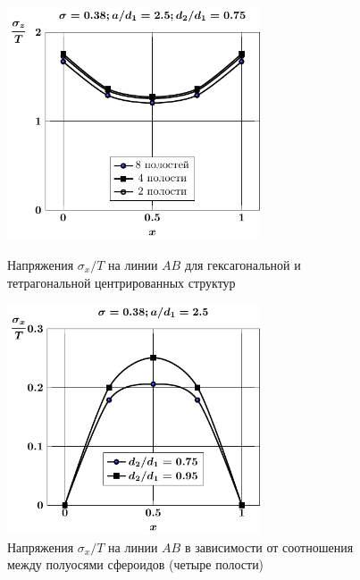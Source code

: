 %

\begin{figure}[h!]
\centering\footnotesize
\parbox[b]{7.5cm}{\centering\includegraphics[width=7.5cm]{cav8-4-2-sig_z-spheroids.pdf}
\caption{Напряжения $\sigma_x/T$ на линии $AB$ для гексагональной и тетрагональной центрированных структур
\label{f:9:4}}}\hfil\hfil
\parbox[b]{7.5cm}{\centering\includegraphics[width=7.5cm]{cav4-d-sig_x.pdf}
\caption{Напряжения $\sigma_x/T$ на линии $AB$ в зависимости от соотношения между полуосями сфероидов (четыре полости)
\label{f:9:5}}}
\end{figure}

